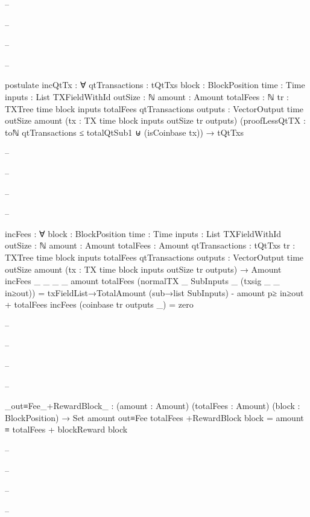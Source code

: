 \documentclass{beamer}
\begin{document}
{\begin{frame}
\begin{code}
-- \end{code}
-- \end{frame}
-- \begin{frame}
-- \begin{code}

        postulate
          incQtTx : ∀ {qtTransactions : tQtTxs}
            {block : BlockPosition} {time : Time}
            {inputs : List TXFieldWithId}
            {outSize : ℕ} {amount : Amount}
            {totalFees : ℕ}
            {tr : TXTree time block inputs totalFees qtTransactions}
            {outputs : VectorOutput time outSize amount}
            (tx : TX {time} {block} {inputs} {outSize} tr outputs)
            (proofLessQtTX :
                toℕ qtTransactions ≤ totalQtSub1
                ⊎
                (isCoinbase tx))
            → tQtTxs

-- \end{code}
-- \end{frame}
-- \begin{frame}
-- \begin{code}

        incFees : ∀ {block : BlockPosition} {time : Time}
          {inputs : List TXFieldWithId}
          {outSize : ℕ} {amount : Amount}
          {totalFees : Amount} {qtTransactions : tQtTxs}
          {tr : TXTree time block inputs totalFees qtTransactions}
          {outputs : VectorOutput time outSize amount}
          (tx : TX {time} {block} {inputs} {outSize} tr outputs)
          → Amount
        incFees {_} {_} {_} {_} {amount} {totalFees}
          (normalTX _ SubInputs _ (txsig _ _ in≥out)) =
          txFieldList→TotalAmount (sub→list SubInputs)
          - amount p≥ in≥out
          + totalFees
        incFees (coinbase tr outputs _) = zero

-- \end{code}
-- \end{frame}
-- \begin{frame}
-- \begin{code}

        _out≡Fee_+RewardBlock_ : (amount : Amount)
          (totalFees : Amount)
          (block : BlockPosition) → Set
        amount out≡Fee totalFees +RewardBlock block =
          amount ≡ totalFees + blockReward block

-- \end{code}
-- \end{frame}
-- \begin{frame}
-- \begin{code}



\end{code}
\end{frame}}
\end{document}
